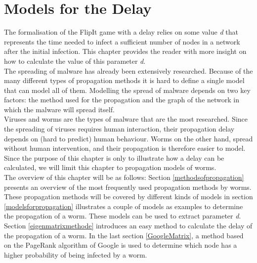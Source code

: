 \chapter{Models for the Delay}
\label{chapter4: Worm propagation}



The formalisation of the FlipIt game with a delay relies on some value  \textit{d} that represents the time needed to infect a sufficient number of nodes in a network after the initial infection. This chapter provides the reader with more insight on how to calculate the value of this parameter \textit{d}.  \\

The spreading of malware has already been extensively researched. Because of the many different types of propagation methods it is hard to define a single model that can model all of them. Modelling the spread of malware depends on two key factors: the method used for the propagation and the graph of the network in which the malware will spread itself. \\
Viruses and worms are the types of malware that are the most researched. Since the spreading of viruses requires human interaction, their propagation delay depends on (hard to predict) human behaviour. Worms on the other hand, spread without human intervention, and their propagation is therefore easier to model. Since the purpose of this chapter is only to illustrate how a delay can be calculated, we will limit this chapter to propagation models of worms. \\

The overview of this chapter will be as follows: Section \ref{methodsofpropagation} presents an overview of the most frequently used propagation methods by worms. These propagation methods will be covered by different kinds of models in section \ref{modelsforpropagation} illustrates a couple of models as examples to determine the propagation of a worm. These models can be used to extract parameter \textit{d}. Section \ref{eigenmatrixmethode} introduces an easy method to calculate the delay of the propagation of a worm. In the last section \ref{GoogleMatrix}, a method based on the PageRank algorithm of Google is used to determine which node has a higher probability of being infected by a worm. %



